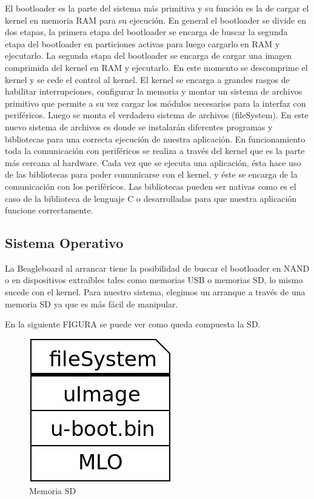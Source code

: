El bootloader es la parte del sistema más primitiva y su función es la de cargar el kernel en memoria RAM para su ejecución. En general el bootloader se divide en dos etapas, la primera etapa del bootloader se encarga de buscar la segunda etapa del bootloader en particiones activas para luego cargarlo en RAM y ejecutarlo. La segunda etapa del bootloader se encarga de cargar una imagen comprimida del kernel en RAM y ejecutarlo. En este momento se descomprime el kernel y se cede el control al kernel.
El kernel se encarga a grandes rasgos de habilitar interrupciones, configurar la memoria y montar un sistema de archivos primitivo que permite a su vez cargar los módulos necesarios para la interfaz con periféricos. Luego se monta el verdadero sistema de archivos (fileSystem). En este nuevo sistema de archivos es donde se instalarán diferentes programas y bibliotecas para una correcta ejecución de nuestra aplicación.
En funcionamiento toda la comunicación con periféricos se realiza a través del kernel que es la parte más cercana al hardware.
Cada vez que se ejecuta una aplicación, ésta hace uso de las bibliotecas para poder comunicarse con el kernel, y éste se encarga de la comunicación con los periféricos. Las bibliotecas pueden ser nativas como es el caso de la biblioteca de lenguaje C o desarrolladas para que nuestra aplicación funcione correctamente.


\subsection{Sistema Operativo}
La Beagleboard al arrancar tiene la posibilidad de buscar el bootloader en NAND o en dispositivos extraíbles tales como memorias USB o memorias SD, lo mismo sucede con el kernel. Para nuestro sistema, elegimos un arranque a través de una memoria SD ya que es más fácil de manipular.

En la siguiente FIGURA se puede ver como queda compuesta la SD.

\begin{figure}[H]
\centering
  \begin{center}
  \includegraphics[scale=.4]{Imagenes/sd.jpg} 
  \end{center}
  \caption{Memoria SD}\label{Fig:HW} 
\end{figure}

